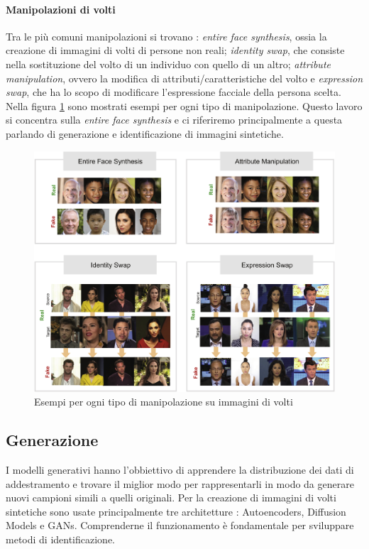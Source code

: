 \paragraph{Manipolazioni di volti} Tra le più comuni manipolazioni si trovano \cite{tolosana2020deepfakes}:
\textit{entire face synthesis}, ossia la creazione di immagini di volti di persone non reali; \textit{identity swap}, che consiste nella sostituzione del volto di un individuo con quello di un altro; \textit{attribute manipulation}, ovvero la modifica di attributi/caratteristiche del volto e \textit{expression swap}, che ha lo scopo di modificare l'espressione facciale della persona scelta. Nella figura \ref{fig:facemanip} sono mostrati esempi per ogni tipo di manipolazione.
Questo lavoro si concentra sulla \textit{entire face synthesis} e ci riferiremo principalmente a questa parlando di generazione e identificazione  di immagini sintetiche.
\begin{figure}
    \centering
     \includegraphics[width=1\linewidth]{img/face manipulations.jpg}
     \caption{Esempi per ogni tipo di manipolazione su immagini di volti}
     \label{fig:facemanip}
\end{figure}
\subsection{Generazione}
I modelli generativi  hanno l'obbiettivo di apprendere la distribuzione dei dati di addestramento e trovare il miglior modo per rappresentarli in modo da generare nuovi campioni simili a quelli originali.
Per la creazione di immagini di volti sintetiche sono usate principalmente tre architetture \cite{fernando2025face}: Autoencoders, Diffusion Models e GANs. Comprenderne il funzionamento è fondamentale per sviluppare metodi di identificazione.
